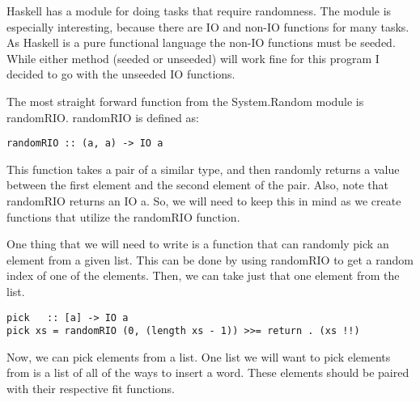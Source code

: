 \documentclass[12pt]{report}   %
\begin{document}
    \vspace{12pt}

    Haskell has a module for doing tasks that require randomness. The module is
    especially interesting, because there are IO and non-IO functions for many
    tasks. As Haskell is a pure functional language the non-IO functions must
    be seeded. While either method (seeded or unseeded) will work fine for
    this program I decided to go with the unseeded IO functions.

    \vspace{12pt}

    The most straight forward function from the System.Random  module is
    randomRIO.  randomRIO is defined as:

    \vspace{12pt}

    \begin{lstlisting}
randomRIO :: (a, a) -> IO a
    \end{lstlisting}

    \vspace{12pt}

    This function takes a pair of a similar type, and then randomly returns a
    value between the first element and the second element of the pair. Also,
    note that randomRIO returns an IO a. So, we will need to keep this in mind
    as we create functions that utilize the randomRIO function.

    \vspace{12pt}

    One thing that we will need to write is a function that can randomly pick
    an element from a given list. This can be done by using randomRIO to get a
    random index of one of the elements. Then, we can take just that one
    element from the list.

    \vspace{12pt}

    \begin{lstlisting}
pick   :: [a] -> IO a
pick xs = randomRIO (0, (length xs - 1)) >>= return . (xs !!)
    \end{lstlisting}

    \vspace{12pt}

    Now, we can pick elements from a list. One list we will want to pick
    elements from is a list of all of the ways to insert a word. These
    elements should be paired with their respective fit functions.

    \vspace{12pt}
\end{document}
